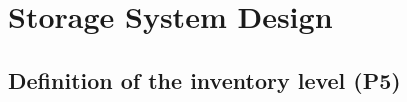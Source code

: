\chapter{Storage System Design} \label{chapWhDesign}


\section{Definition of the inventory level (P5)} \label{secInventoryDesign}